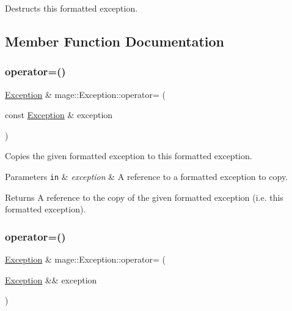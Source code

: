 Destructs this formatted exception. 

\subsection{Member Function Documentation}
\mbox{\label{classmage_1_1_exception_ab0e7e6b32b07505271a4a88067ab54f4}} 
\subsubsection{\texorpdfstring{operator=()}{operator=()}\hspace{0.1cm}{\footnotesize\ttfamily [1/2]}}
{\footnotesize\ttfamily \mbox{\hyperlink{classmage_1_1_exception}{Exception}} \& mage\+::\+Exception\+::operator= (\begin{DoxyParamCaption}\item[{const \mbox{\hyperlink{classmage_1_1_exception}{Exception}} \&}]{exception }\end{DoxyParamCaption})\hspace{0.3cm}{\ttfamily [default]}}

Copies the given formatted exception to this formatted exception.


\begin{DoxyParams}[1]{Parameters}
\mbox{\tt in}  & {\em exception} & A reference to a formatted exception to copy. \\
\hline
\end{DoxyParams}
\begin{DoxyReturn}{Returns}
A reference to the copy of the given formatted exception (i.\+e. this formatted exception). 
\end{DoxyReturn}
\mbox{\label{classmage_1_1_exception_aa9305c6bd8836f56ffa970473533f031}} 
\subsubsection{\texorpdfstring{operator=()}{operator=()}\hspace{0.1cm}{\footnotesize\ttfamily [2/2]}}
{\footnotesize\ttfamily \mbox{\hyperlink{classmage_1_1_exception}{Exception}} \& mage\+::\+Exception\+::operator= (\begin{DoxyParamCaption}\item[{\mbox{\hyperlink{classmage_1_1_exception}{Exception}} \&\&}]{exception }\end{DoxyParamCaption})\hspace{0.3cm}{\ttfamily [default]}}

